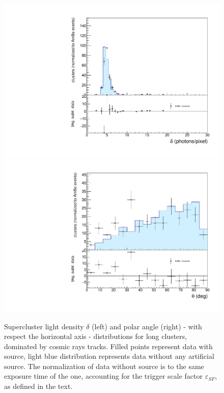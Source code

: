 \begin{figure}[ht]
  \begin{center}
  \includegraphics[width=0.45\linewidth]{figures/density_cosmics}
  \includegraphics[width=0.45\linewidth]{figures/inclination_cosmics}

  \caption{Supercluster light density $\delta$ (left) and  polar
    angle (right) -   with respect the horizontal axis - distributions  for long clusters,
    dominated by cosmic rays tracks.  Filled points represent data
    with \ambe source, light blue distribution represents data without
    any artificial source.  The normalization of data without source is to the
    same exposure time of the \ambe one, accounting for the trigger
    scale factor $\varepsilon_{SF}$, as defined in the
    text.  \label{fig:cosmics}}

\end{center}
\end{figure}
